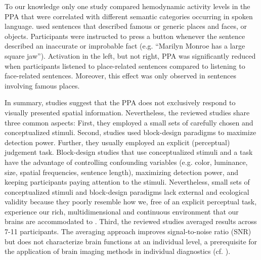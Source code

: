 \documentclass[english]{article}
\begin{document}
To our knowledge only one study \citep{aziz2008modulation} compared hemodynamic
activity levels in the PPA that were correlated with different semantic
categories occurring in spoken language.
\cite{aziz2008modulation} used sentences that described famous or generic places
and faces, or objects.
Participants were instructed to press a button whenever the sentence described
an inaccurate or improbable fact (e.g. ``Marilyn Monroe has a large square
jaw'').
Activation in the left, but not right, PPA was significantly reduced when
participants listened to place-related sentences compared to listening to
face-related sentences. Moreover, this effect was only observed in sentences
involving famous places.

In summary, studies suggest that the PPA does not exclusively respond to
visually presented spatial information.
Nevertheless, the reviewed studies share three common aspects:
First, they employed a small sets of carefully chosen and conceptualized
stimuli.
Second, studies used block-design paradigms to maximize detection power.
Further, they usually employed an explicit (perceptual) judgement task.
Block-design studies that use conceptualized stimuli and a task have the
advantage of controlling confounding variables (e.g. color, luminance, size,
spatial frequencies, sentence length), maximizing detection power, and keeping
participants paying attention to the stimuli.
Nevertheless, small sets of conceptualized stimuli and block-design paradigms
lack external and ecological validity \citep{westfall2016fixing,
hasson2004intersubject} because they poorly resemble how we, free of an explicit
perceptual task, experience our rich, multidimensional and continuous
environment that our brains are accommodated to
\citep{sonkusare2019naturalistic}.
Third, the reviewed studies averaged results across 7-11 participants.
The averaging approach improves signal-to-noise ratio (SNR) but does not
characterize brain functions at an individual level, a prerequisite for the
application of brain imaging methods in individual diagnostics (cf.
\cite{dubois2016building, eickhoff2020towards}).
\end{document}
